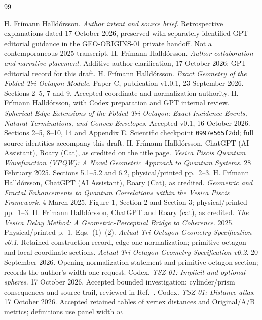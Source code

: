\begin{thebibliography}{99}\small\raggedright
\setlength{\itemsep}{3pt}\setlength{\parskip}{0pt}
 H. Fr\'imann Halld\'orsson. \emph{Author intent and source brief}. Retrospective explanations dated 17 October 2026, preserved with separately identified GPT editorial guidance in the GEO-ORIGINS-01 private handoff. Not a contemporaneous 2025 transcript.
 H. Fr\'imann Halld\'orsson. \emph{Author collaboration and narrative placement}. Additive author clarification, 17 October 2026; GPT editorial record for this draft.
 H. Fr\'imann Halld\'orsson. \emph{Exact Geometry of the Folded Tri-Octagon Module}. Paper C, publication v1.0.1, 23 September 2026. Sections 2--5, 7 and 9. Accepted coordinate and normalization authority.
 H. Fr\'imann Halld\'orsson, with Codex preparation and GPT internal review. \emph{Spherical Edge Extensions of the Folded Tri-Octagon: Exact Incidence Events, Natural Terminations, and Convex Envelopes}. Accepted v0.1, 16 October 2026. Sections 2--5, 8--10, 14 and Appendix E. Scientific checkpoint \texttt{0997e565f2dd}; full source identities accompany this draft.
 H. Fr\'imann Halld\'orsson, ChatGPT (AI Assistant), Roary (Cat), as credited on the title page. \emph{Vesica Piscis Quantum Wavefunction (VPQW): A Novel Geometric Approach to Quantum Systems}. 28 February 2025. Sections 5.1--5.2 and 6.2, physical/printed pp.~2--3.
 H. Fr\'imann Halld\'orsson, ChatGPT (AI Assistant), Roary (Cat), as credited. \emph{Geometric and Fractal Enhancements to Quantum Correlations within the Vesica Piscis Framework}. 4 March 2025. Figure 1, Section 2 and Section 3; physical/printed pp.~1--3.
 H. Fr\'imann Halld\'orsson, ChatGPT and Roary (cat), as credited. \emph{The Vesica Delay Method: A Geometric-Perceptual Bridge to Coherence}. 2025. Physical/printed p.~1, Eqs.~(1)--(2).
 \emph{Actual Tri-Octagon Geometry Specification v0.1}. Retained construction record, edge-one normalization; primitive-octagon and local-coordinate sections.
 \emph{Actual Tri-Octagon Geometry Specification v0.2}. 20 September 2026. Opening normalization statement and primitive-octagon section; records the author's width-one request.
 Codex. \emph{TSZ-01: Implicit and optional spheres}. 17 October 2026. Accepted bounded investigation; cylinder/prism consequences and source trail, reviewed in Ref.~\cite{TSZReview}.
 Codex. \emph{TSZ-01: Distance atlas}. 17 October 2026. Accepted retained tables of vertex distances and Original/A/B metrics; definitions use panel width $w$.

\end{thebibliography}
